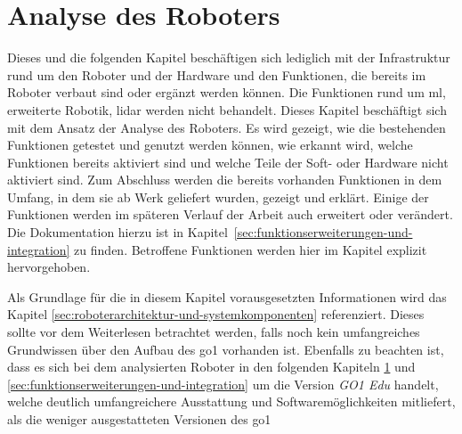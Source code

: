 \section{Analyse des Roboters}
\label{sec:analyse-des-roboters}

Dieses und die folgenden Kapitel beschäftigen sich lediglich mit der Infrastruktur rund um den Roboter
und der Hardware und den Funktionen, die bereits im Roboter verbaut sind oder ergänzt werden können.
Die Funktionen rund um \gls{ml}, erweiterte Robotik, \gls{lidar} werden nicht behandelt.
Dieses Kapitel beschäftigt sich mit dem Ansatz der Analyse des Roboters.
Es wird gezeigt, wie die bestehenden Funktionen getestet und genutzt werden können, wie erkannt wird,
welche Funktionen bereits aktiviert sind und welche Teile der Soft- oder Hardware nicht aktiviert sind.
Zum Abschluss werden die bereits vorhanden Funktionen in dem Umfang, in dem sie ab Werk geliefert wurden,
gezeigt und erklärt.
Einige der Funktionen werden im späteren Verlauf der Arbeit auch erweitert oder verändert.
Die Dokumentation hierzu ist in Kapitel~\ref{sec:funktionserweiterungen-und-integration} zu finden.
Betroffene Funktionen werden hier im Kapitel explizit hervorgehoben.


Als Grundlage für die in diesem Kapitel vorausgesetzten Informationen wird das Kapitel \ref{sec:roboterarchitektur-und-systemkomponenten}
referenziert.
Dieses sollte vor dem Weiterlesen betrachtet werden, falls noch kein umfangreiches Grundwissen über den Aufbau des \gls{go1}
vorhanden ist.
Ebenfalls zu beachten ist, dass es sich bei dem analysierten Roboter in den folgenden Kapiteln \ref{sec:analyse-des-roboters}
und \ref{sec:funktionserweiterungen-und-integration} um die Version \emph{GO1 Edu} handelt, welche deutlich umfangreichere
Ausstattung und Softwaremöglichkeiten mitliefert, als die weniger ausgestatteten Versionen des \gls{go1}












